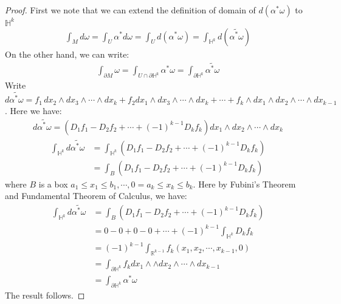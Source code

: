 \documentclass[11pt,oneside]{book}
\theoremstyle{break}
\theoremstyle{break}
\newcommand{\R}{\mathbb{R}}
\newcommand{\pd}{\partial}
\newcommand{\that}[1]{\widetilde{#1}}
\begin{document}
\begin{proof}
First we note that we can extend the definition of domain of $d(\alpha^*\omega)$ to $\mathbb{H}^k$
\begin{align*}
\int_M d\omega = \int_U \alpha^* d\omega = \int_U d(\alpha^*\omega) = \int_{\mathbb{H}^k} d(\that{\alpha^*\omega})
\end{align*} 
On the other hand, we can write:
\begin{align*}
\int_{\pd M}\omega = \int_{U \cap \pd \mathbb{H}^k}\alpha^*\omega  = \int_{\pd \mathbb{H}^k} \that{\alpha^*\omega}
\end{align*}
Write $d\that{\alpha^*\omega} = f_1 \, dx_2 \wedge dx_3\wedge \cdots \wedge dx_k+ f_2 dx_1 \wedge dx_3 \wedge \cdots \wedge dx_k + \cdots + f_k \wedge dx_1 \wedge dx_2 \wedge \cdots \wedge dx_{k-1}$. Here we have:
\begin{align*}
d\that{\alpha^*\omega} = (D_1f_1 - D_2f_2 + \cdots + (-1)^{k-1}D_kf_k)dx_1 \wedge dx_2 \wedge \cdots \wedge dx_k
\end{align*}
\begin{align*}
\int_{\mathbb{H}^k} d\that{\alpha^*\omega} &= \int_{\mathbb{H}^k}(D_1f_1 - D_2f_2 + \cdots + (-1)^{k-1}D_kf_k) \\
&= \int_B (D_1f_1 - D_2f_2 + \cdots + (-1)^{k-1}D_kf_k)
\end{align*}
where $B$ is a box $a_1 \leq x_1 \leq b_1 , \cdots, 0 = a_k \leq x_k \leq b_k$. Here by Fubini's Theorem and Fundamental Theorem of Calculus, we have:
\begin{align*}
\int_{\mathbb{H}^k} d\that{\alpha^*\omega} &= \int_B (D_1f_1 - D_2f_2 + \cdots + (-1)^{k-1}D_kf_k)\\
&= 0 - 0 +0 - 0 +\cdots + (-1)^{k-1} \int_{\mathbb{H}^k} D_k f_k\\
&= (-1)^{k-1}\int_{\R^{k-1} } f_k(x_1, x_2,\cdots, x_{k-1}, 0)\\
&= \int_{\pd \mathbb{H}^k} f_k dx_1 \wedge \wedge dx_2  \wedge \cdots \wedge dx_{k-1} \\
&= \int_{\pd \mathbb{H}^k} \alpha^*\omega
\end{align*}
The result follows.
\end{proof}
\end{document}
